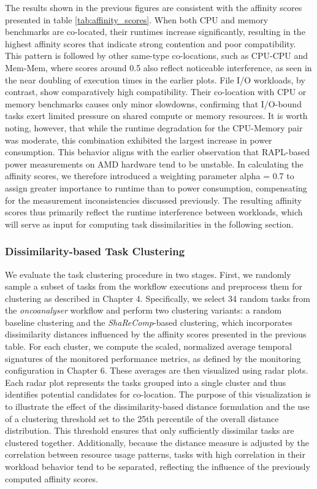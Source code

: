 The results shown in the previous figures are consistent with the affinity scores presented in table \ref{tab:affinity_scores}. When both CPU and memory benchmarks are co-located, their runtimes increase significantly, resulting in the highest affinity scores that indicate strong contention and poor compatibility. This pattern is followed by other same-type co-locations, such as CPU-CPU and Mem-Mem, where scores around 0.5 also reflect noticeable interference, as seen in the near doubling of execution times in the earlier plots. File I/O workloads, by contrast, show comparatively high compatibility. Their co-location with CPU or memory benchmarks causes only minor slowdowns, confirming that I/O-bound tasks exert limited pressure on shared compute or memory resources.
It is worth noting, however, that while the runtime degradation for the CPU-Memory pair was moderate, this combination exhibited the largest increase in power consumption. This behavior aligns with the earlier observation that RAPL-based power measurements on AMD hardware tend to be unstable. In calculating the affinity scores, we therefore introduced a weighting parameter alpha = 0.7 to assign greater importance to runtime than to power consumption, compensating for the measurement inconsistencies discussed previously. The resulting affinity scores thus primarily reflect the runtime interference between workloads, which will serve as input for computing task dissimilarities in the following section.

\subsubsection{Dissimilarity-based Task Clustering}
\label{sec:evaluation_task_consolidation}
We evaluate the task clustering procedure in two stages. First, we randomly sample a subset of tasks from the workflow executions and preprocess them for clustering as described in Chapter 4. Specifically, we select 34 random tasks from the \textit{oncoanalyser} workflow and perform two clustering variants: a random baseline clustering and the \textit{ShaReComp}-based clustering, which incorporates dissimilarity distances influenced by the affinity scores presented in the previous table.
For each cluster, we compute the scaled, normalized average temporal signatures of the monitored performance metrics, as defined by the monitoring configuration in Chapter 6. These averages are then visualized using radar plots. Each radar plot represents the tasks grouped into a single cluster and thus identifies potential candidates for co-location. The purpose of this visualization is to illustrate the effect of the dissimilarity-based distance formulation and the use of a clustering threshold set to the 25th percentile of the overall distance distribution. This threshold ensures that only sufficiently dissimilar tasks are clustered together.
Additionally, because the distance measure is adjusted by the correlation between resource usage patterns, tasks with high correlation in their workload behavior tend to be separated, reflecting the influence of the previously computed affinity scores.

